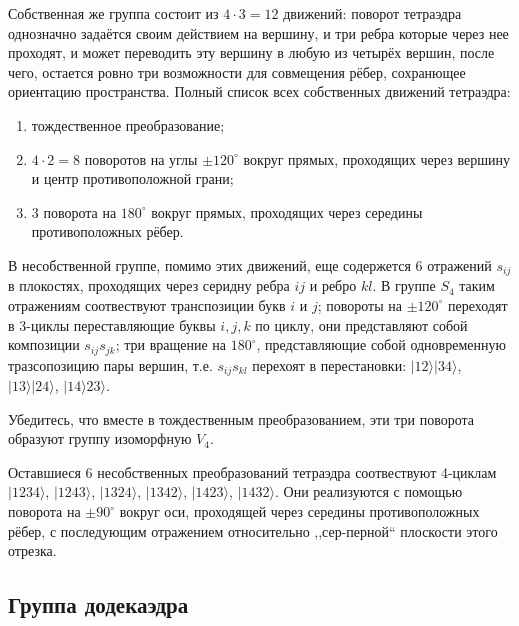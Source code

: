 Собственная же группа состоит из $4 \cdot 3 = 12$ движений: поворот тетраэдра однозначно задаётся своим действием на вершину, и три ребра которые через нее проходят, и может переводить эту вершину в любую из четырёх вершин, после чего, остается ровно три возможности для совмещения рёбер, сохранющее ориентацию пространства. Полный список всех собственных движений тетраэдра: 
\begin{enumerate}
    \item тождественное преобразование;
    \item $4\cdot 2 = 8$ поворотов на углы $\pm 120^\circ$ вокруг прямых, проходящих через вершину и центр противоположной грани;
    \item 3 поворота на $180^\circ$ вокруг прямых, проходящих через середины противоположных рёбер.
\end{enumerate}

В несобственной группе, помимо этих движений, еще содержется 6 отражений $s_{ij}$ в плокостях, проходящих через серидну ребра $ij$ и ребро $kl$. В группе $S_4$ таким отражениям соотвествуют транспозиции букв $i$ и $j$; повороты на $\pm 120^\circ$ переходят в 3-циклы переставляющие буквы $i,j,k$ по циклу, они представляют собой композиции $s_{ij}s_{jk}$; три вращение на $180^\circ$, представляющие собой одновременную тразсопозицию пары вершин, т.е. $s_{ij}s_{kl}$ перехоят в перестановки: $|12\rangle |34\rangle$, $|13\rangle |24\rangle$, $|14\rangle 23\rangle$.

\begin{practice}
    Убедитесь, что вместе в тождественным преобразованием, эти три поворота образуют группу изоморфную $V_4$.
\end{practice}

Оставшиеся 6 несобственных преобразований тетраэдра соотвествуют 4-циклам $|1234\rangle$, $| 1243 \rangle$, $|1324 \rangle $, $| 1342 \rangle $, $|1423 \rangle $, $| 1432 \rangle$. Они реализуются с помощью поворота на $\pm 90^\circ$ вокруг оси, проходящей через середины противоположных рёбер, с последующим отражением относительно ,,сер-\-пер\-ной`` плоскости этого отрезка.

\subsection{Группа додекаэдра}


